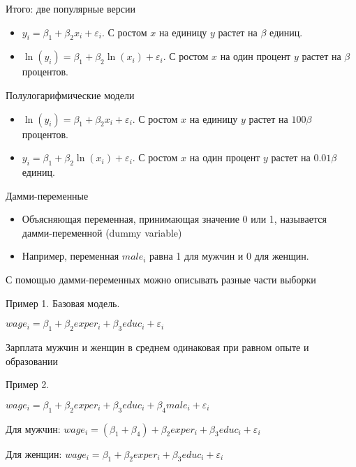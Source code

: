 \documentclass[ignorenonframetext,]{beamer}
\begin{document}
\begin{frame}{Итого: две популярные версии}

\begin{itemize}
\item
  $y_i = \beta_1 + \beta_2 x_i + \varepsilon_i$. С ростом $x$ на единицу
  $y$ растет на $\beta$ единиц.
\item
  $\ln( y_i) = \beta_1 + \beta_2 \ln( x_i) + \varepsilon_i$. С ростом
  $x$ на один процент $y$ растет на $\beta$ процентов.
\end{itemize}

\end{frame}

\begin{frame}{Полулогарифмические модели}

\begin{itemize}
\item
  $\ln( y_i) = \beta_1 + \beta_2 x_i + \varepsilon_i$. С ростом $x$ на
  единицу $y$ растет на $100\beta$ процентов.
\item
  $y_i = \beta_1 + \beta_2 \ln( x_i) + \varepsilon_i$. С ростом $x$ на
  один процент $y$ растет на $0.01\beta$ единиц.
\end{itemize}

\end{frame}

\begin{frame}{Дамми-переменные}

\begin{itemize}
\item
  Объясняющая переменная, принимающая значение 0 или 1, называется
  дамми-переменной (dummy variable)
\item
  Например, переменная $male_i$ равна 1 для мужчин и 0 для женщин.
\end{itemize}

\end{frame}

\begin{frame}{С помощью дамми-переменных можно описывать разные части
выборки}

Пример 1. Базовая модель.

$wage_i = \beta_1 + \beta_2 exper_i + \beta_3 educ_i + \varepsilon_i$

Зарплата мужчин и женщин в среднем одинаковая при равном опыте и
образовании

\end{frame}

\begin{frame}{Пример 2.}

$wage_i = \beta_1 + \beta_2 exper_i + \beta_3 educ_i + \beta_4 male_i + \varepsilon_i$

Для мужчин:
$wage_i = (\beta_1+\beta_4) + \beta_2 exper_i + \beta_3 educ_i + \varepsilon_i$

Для женщин:
$wage_i = \beta_1 + \beta_2 exper_i + \beta_3 educ_i + \varepsilon_i$

\end{frame}
\end{document}
